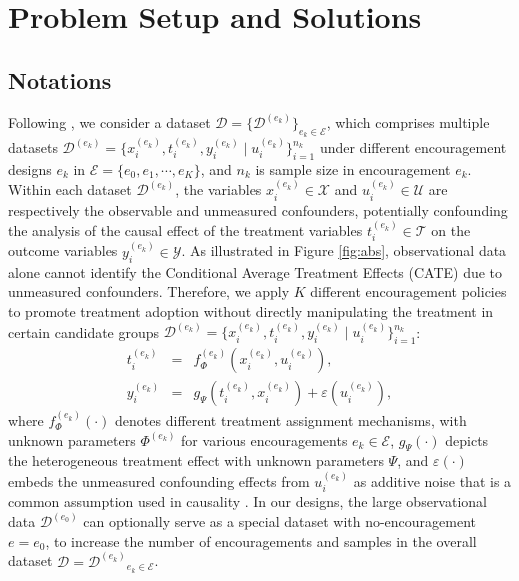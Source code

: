\documentclass[journal]{IEEEtran}
\begin{document}
\section{Problem Setup and Solutions}
\subsection{Notations}
Following \cite{liu2021heterogeneous,liu2021kernelized}, we consider a dataset $\mathcal{D} = \{ \mathcal{D}^{(e_k)} \}_{e_k \in \mathcal{E}}$, which comprises multiple datasets $\mathcal{D}^{(e_k)} = \{x_i^{(e_k)}, t_i^{(e_k)}, y_i^{(e_k)} 
\mid u_i^{(e_k)} \}_{i=1}^{n_k}$ under different encouragement designs $e_k$ in  $\mathcal{E} = \{e_0,e_1,\cdots, e_K\}$, and $n_k$ is sample size in encouragement $e_k$. 
Within each dataset $\mathcal{D}^{(e_k)}$, the variables $x_i^{(e_k)} \in \mathcal{X}$ and $u_i^{(e_k)} \in \mathcal{U}$ are respectively the observable and unmeasured confounders, potentially confounding the analysis of the causal effect of the treatment variables $t_i^{(e_k)} \in \mathcal{T}$ on the outcome variables $y_i^{(e_k)} \in \mathcal{Y}$.
As illustrated in Figure \ref{fig:abs}, observational data alone cannot identify the Conditional Average Treatment Effects (CATE) due to unmeasured confounders. Therefore, we apply $K$ different encouragement policies to promote treatment adoption without directly manipulating the treatment in certain candidate groups
$\mathcal{D}^{(e_k)} = \{x_i^{(e_k)}, t_i^{(e_k)}, y_i^{(e_k)} 
\mid u_i^{(e_k)} \}_{i=1}^{n_k}$:
\begin{eqnarray}
    \label{eq:T}
    t_i^{(e_k)} & = &
    f^{(e_k)}_{\Phi}(x_i^{(e_k)}, u_i^{(e_k)}), \\ 
    y_i^{(e_k)} & = & g_{\Psi}( t_i^{(e_k)}, x_i^{(e_k)}) + \varepsilon( u_i^{(e_k)} ),
    \label{eq:Y}
\end{eqnarray}
where  $f^{(e_k)}_\Phi(\cdot)$ denotes different treatment assignment mechanisms, with unknown parameters $\Phi^{(e_k)}$ for various encouragements $e_k \in \mathcal{E}$, $g_{\Psi}(\cdot)$ depicts the heterogeneous treatment effect with unknown parameters $\Psi$, and $\varepsilon( \cdot )$ embeds the unmeasured confounding effects from $u_i^{(e_k)}$ as additive noise that is a common assumption used in causality \cite{newey2003instrumental,imbens2015causal,hartford2017deep}.
In our designs, the large observational data $\mathcal{D}^{(e_0)}$ can optionally serve as a special dataset with no-encouragement $e = e_0$, to increase the number of encouragements and samples in the overall dataset $\mathcal{D} = { \mathcal{D}^{(e_k)} }_{e_k \in \mathcal{E}}$.
\end{document}
